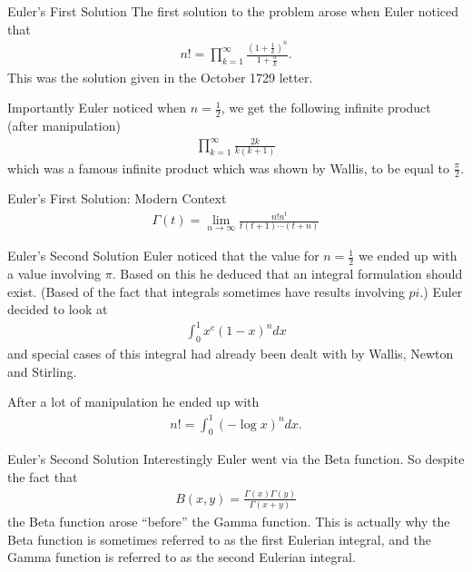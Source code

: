 \documentclass[pdf]{beamer}
\newcommand{\lra}{\longrightarrow}
\begin{document}
\begin{frame}{Euler's First Solution}
    The first solution to the problem arose when Euler noticed that
    \begin{align*}
        n! = \prod_{k=1}^\infty \frac{\left( 1 + \frac{1}{k}\right)^n}{1 + \frac{n}{k}}.
    \end{align*}
    This was the solution given in the October 1729 letter. 

    Importantly Euler noticed when $ n = \frac{1}{2} $, we get the following infinite product (after manipulation)
    \begin{align*}
        \prod_{k=1}^\infty \frac{2k}{k(k+1)}
    \end{align*}
    which was a famous infinite product which was shown by Wallis, to be equal to $ \frac{\pi}{2} $. 
\end{frame}
\begin{frame}{Euler's First Solution: Modern Context}
    \begin{align*}
        \Gamma(t) = \lim_{n \lra \infty} \frac{n! n^t}{t(t+1) \cdots (t + n)}
    \end{align*}
\end{frame}
\begin{frame}{Euler's Second Solution}
    Euler noticed that the value for $ n = \frac{1}{2} $ we ended up with a value involving $ \pi $. Based on this he deduced that an integral formulation should exist. (Based of the fact that integrals sometimes have results involving $ pi $.)
    Euler decided to look at
    \begin{align*}
        \int_0^1 x^c(1-x)^ndx
    \end{align*}
    and special cases of this integral had already been dealt with by Wallis, Newton and Stirling. 

    After a lot of manipulation he ended up with
    \begin{align*}
        n! = \int_0^1 (-\log x)^n dx.
    \end{align*}
\end{frame}
\begin{frame}{Euler's Second Solution}
    Interestingly Euler went via the Beta function. So despite the fact that
    \begin{align}
        B(x,y) = \frac{\Gamma(x)\Gamma(y)}{\Gamma(x+y)}
    \end{align}
    the Beta function arose ``before'' the Gamma function. This is actually why the Beta function is sometimes referred to as the first Eulerian integral, and the Gamma function is referred to as the second Eulerian integral.
\end{frame}
\end{document}
